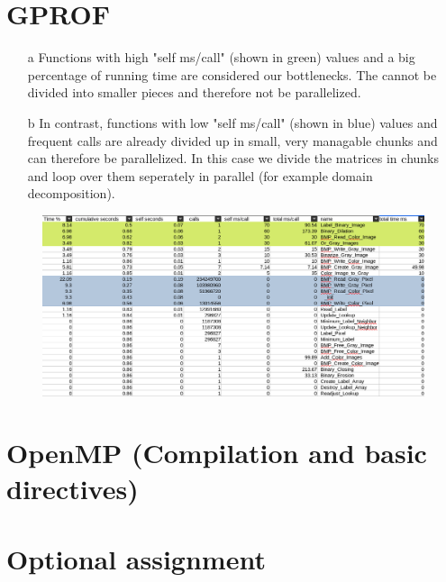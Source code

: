 \documentclass[11pt,a4paper]{article}
\begin{document}
\section{GPROF}
\begin{itemize}
\item[a] Functions with high "self ms/call" (shown in green) values and a big percentage of running time are considered our bottlenecks. The cannot be divided into smaller pieces and therefore not be parallelized.
\item[b] In contrast, functions with low "self ms/call" (shown in blue) values and frequent calls are already divided up in small, very managable chunks and can therefore be parallelized. In this case we divide the matrices in chunks and loop over them seperately in parallel (for example domain decomposition).
\end{itemize}
\begin{center}
\begin{figure}[h]
\includegraphics[width=\textwidth]{calls.png}
\end{figure}
\end{center}
\newpage
\section{OpenMP (Compilation and basic directives)}

\newpage
\section{Optional assignment}
\end{document}
